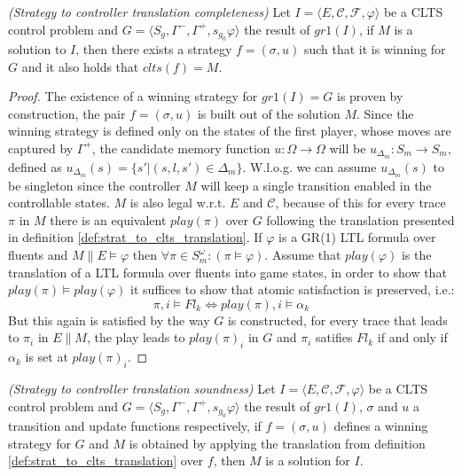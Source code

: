 \begin{definition}\label{def:strat_completeness} \emph{(Strategy to controller translation completeness)} 
	Let $I = \langle E, \mathcal{C}, \mathcal{F}, \varphi \rangle$ be a CLTS control problem and $G = \langle S_g, \Gamma^-,\Gamma^+,s_{g_0}\varphi \rangle$ the result of $gr1(I)$, if $M$ is a solution to $I$, then there exists a strategy $f=(\sigma, u)$ such that it is winning for $G$ and it also holds that $clts(f) = M$.
\end{definition}

\begin{proof}\label{def:strat_completeness_proof}
	The existence of a winning strategy for $gr1(I)=G$ is proven by construction, the pair
	$f=(\sigma, u)$ is built out of the solution $M$. Since the winning strategy is defined only on the
	states of the first player, whose moves are captured by $\Gamma^{+}$, the candidate memory
	function $u:\Omega \rightarrow \Omega$ will be $u_{\Delta_m}:S_m \rightarrow S_m$, defined 
	as $u_{\Delta_m}(s)=\{ s'|(s,l,s')\in \Delta_m\}$. W.l.o.g. we can assume $u_{\Delta_m}(s)$ to be singleton since the controller $M$ will keep a single transition enabled in the controllable states. 
	$M$ is also legal w.r.t. $E$ and $\mathcal{C}$, because of this
	for every trace $\pi$ in $M$ there is an equivalent $play(\pi)$ over $G$ following the translation presented in definition \ref{def:strat_to_clts_translation}.	
	If $\varphi$ is a GR(1) LTL formula over fluents and $M \parallel E \models \varphi$ then $\forall \pi \in S_m^{\omega}:(\pi \models \varphi)$. Assume that $play(\varphi)$ is the translation of a LTL formula over fluents into game states, in order to show that $play(\pi) \models play(\varphi)$ it suffices to show that atomic satisfaction is preserved, i.e.: 
	\[\pi,i \models Fl_k \iff play(\pi),i \models \alpha_k \]
	But this again is satisfied by the way $G$ is constructed, for every trace that leads to $\pi_i$ in $E \parallel M$, the play leads to $play(\pi)_i$ in $G$ and $\pi_i$ satifies $Fl_k$ if and only if $\alpha_k$ is set at $play(\pi)_i$.	
\end{proof}

\begin{definition}\label{def:strat_soundness} \emph{(Strategy to controller translation soundness)} 
	Let $I = \langle E, \mathcal{C}, \mathcal{F}, \varphi \rangle$ be a CLTS control problem and $G = \langle S_g, \Gamma^-,\Gamma^+,s_{g_0}\varphi \rangle$ the result of $gr1(I)$, $\sigma$ and $u$ a transition and update functions respectively, if $f=(\sigma, u)$ defines a winning strategy for $G$ and $M$ is obtained by applying the translation from definition \ref{def:strat_to_clts_translation} over $f$, then $M$ is a solution for $I$.
\end{definition}

